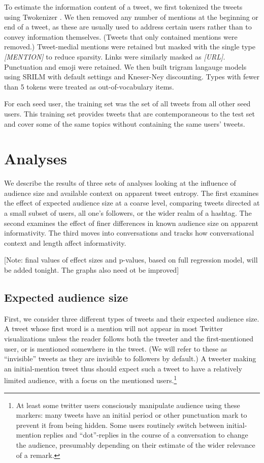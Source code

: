 \documentclass[11pt,letterpaper]{article}
\begin{document}
To estimate the information content of a tweet, we first tokenized the tweets using Twokenizer \cite{owoputi2013}. We then removed any number of mentions at the beginning or end of a tweet, as these are usually used to address certain users rather than to convey information themselves. (Tweets that only contained mentions were removed.)  Tweet-medial mentions were retained but masked with the single type {\it [MENTION]} to reduce sparsity. Links were similarly masked as {\it [URL]}. Punctuation and emoji were retained. We then built trigram langauge models using SRILM with default settings and Kneser-Ney discounting.  Types with fewer than 5 tokens were treated as out-of-vocabulary items. 

For each seed user, the training set was the set of all tweets from all other seed users.  This training set provides tweets that are contemporaneous to the test set and cover some of the same topics without containing the same users' tweets.

\section{Analyses}

We describe the results of three sets of analyses looking at the influence of audience size and available context on apparent tweet entropy. The first examines the effect of expected audience size at a coarse level, comparing tweets directed at a small subset of users, all one's followers, or the wider realm of a hashtag.   The second examines the effect of finer differences in known audience size on apparent informativity.  The third moves into conversations and tracks how conversational context and length affect informativity.

[Note: final values of effect sizes and p-values, based on full regression model, will be added tonight. The graphs also need ot be improved]

\subsection{Expected audience size}

First, we consider three different types of tweets and their expected audience size.  A tweet whose first word is a mention will not appear in most Twitter visualizations unless the reader follows both the tweeter and the first-mentioned user, or is mentioned somewhere in the tweet. (We will refer to these as ``invisible'' tweets as they are invisible to followers by default.)  A tweeter making an initial-mention tweet thus should expect such a tweet to have a relatively limited audience, with a focus on the mentioned users.\footnote{At least some twitter users consciously manipulate audience using these markers: many tweets have an initial period or other punctuation mark to prevent it from being hidden. Some users routinely switch between initial-mention replies and ``dot''-replies in the course of a conversation to change the audience, presumably depending on their estimate of the wider relevance of a remark.}
\end{document}
